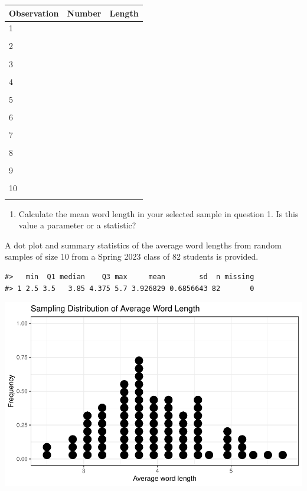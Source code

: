 \documentclass[
]{report}
\providecommand{\tightlist}{%
  \setlength{\itemsep}{0pt}\setlength{\parskip}{0pt}}
\begin{document}
\begin{center}
\begin{tabular}{|l|l|p{1in}|} \hline
Observation & Number & Length  \\ \hline
1 & & \\ 
& & \\ \hline
2 & & \\ 
& & \\ \hline
3 & & \\ 
& & \\ \hline
4 & & \\ 
& & \\ \hline
5 & & \\ 
& & \\ \hline
6 & & \\ 
& & \\ \hline
7 & & \\
& & \\ \hline
8 & & \\ 
& & \\ \hline
9 & &\\ 
& & \\ \hline
10 & & \\ 
& & \\ \hline
\end{tabular}
\end{center}

\begin{enumerate}
\def\labelenumi{\arabic{enumi}.}
\setcounter{enumi}{1}
\tightlist
\item
  Calculate the mean word length in your selected sample in question 1. Is this value a parameter or a statistic?
  \vspace{0.3in}
\end{enumerate}

A dot plot and summary statistics of the average word lengths from random samples of size 10 from a Spring 2023 class of 82 students is provided.

\begin{verbatim}
#>   min  Q1 median    Q3 max     mean        sd  n missing
#> 1 2.5 3.5   3.85 4.375 5.7 3.926829 0.6856643 82       0
\end{verbatim}

\begin{center}\includegraphics[width=0.7\linewidth]{02-A02-sampling_files/figure-latex/unnamed-chunk-1-1} \end{center}
\end{document}
